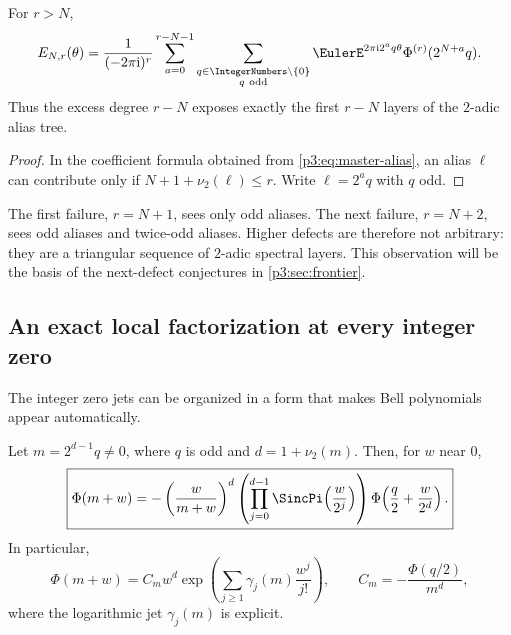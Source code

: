 \documentclass[11pt,oneside]{article}
\numberwithin{equation}{section}
\theoremstyle{definition}
\theoremstyle{remark}
\begin{document}
\begin{corollary}
\label{p3:cor:valuation-filtration}
For $r>N$,
\begin{equation}
 E_{N,r}(\theta)
 =\frac1{(-2\pi\iu)^r}
 \sum_{a=0}^{r-N-1}
 \sum_{\substack{q\in\IntegerNumbers\setminus\{0\}\\q\ \mathrm{odd}}}
 \EulerE^{2\pi\iu 2^aq\theta}
 \Phi^{(r)}(2^{N+a}q).
 \label{p3:eq:valuation-filtration}
\end{equation}
Thus the excess degree $r-N$ exposes exactly the first $r-N$ layers of the $2$-adic alias tree.
\end{corollary}

\begin{proof}
In the coefficient formula obtained from \eqref{p3:eq:master-alias}, an alias $\ell$ can contribute only if
$N+1+\nu_2(\ell)\le r$.  Write $\ell=2^aq$ with $q$ odd.
\end{proof}

\begin{remark}
The first failure, $r=N+1$, sees only odd aliases.  The next failure, $r=N+2$, sees odd aliases and twice-odd aliases.  Higher defects are therefore not arbitrary: they are a triangular sequence of $2$-adic spectral layers.  This observation will be the basis of the next-defect conjectures in \cref{p3:sec:frontier}.
\end{remark}

\subsection{An exact local factorization at every integer zero}

The integer zero jets can be organized in a form that makes Bell polynomials appear automatically.

\begin{proposition}
\label{p3:prop:local-factorization}
Let $m=2^{d-1}q\ne0$, where $q$ is odd and $d=1+\nu_2(m)$.  Then, for $w$ near $0$,
\begin{equation}
 \boxed{\displaystyle
 \Phi(m+w)
 =-\left(\frac{w}{m+w}\right)^d
 \left(\prod_{j=0}^{d-1}\SincPi\!\left(\frac{w}{2^j}\right)\right)
 \Phi\!\left(\frac q2+\frac{w}{2^d}\right).}
 \label{p3:eq:local-factorization}
\end{equation}
In particular,
\begin{equation}
 \Phi(m+w)=C_mw^d
 \exp\!\left(\sum_{j\ge1}\gamma_j(m)\frac{w^j}{j!}\right),
 \qquad
 C_m=-\frac{\Phi(q/2)}{m^d},
 \label{p3:eq:local-Bell-form}
\end{equation}
where the logarithmic jet $\gamma_j(m)$ is explicit.
\end{proposition}
\end{document}
